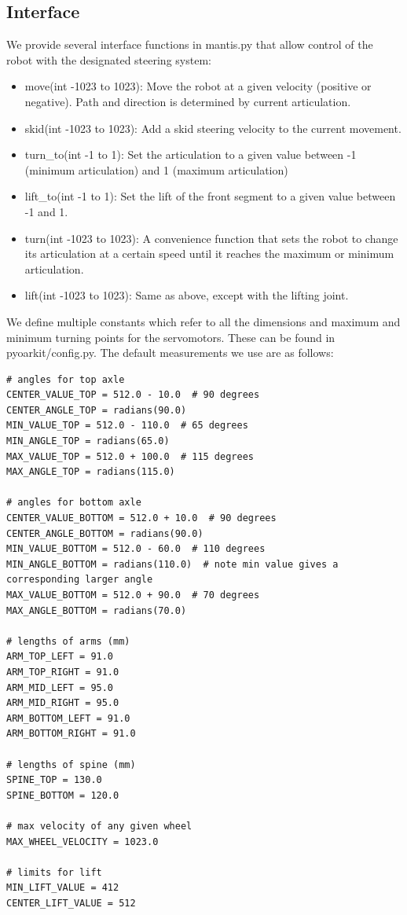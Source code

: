 \documentclass[]{article}
\begin{document}
\subsection{Interface}
We provide several interface functions in mantis.py that allow control of the robot with the designated steering system:
\begin{itemize}
    \item move(int -1023 to 1023): Move the robot at a given velocity (positive or negative). Path and direction is determined by current articulation.
    \item skid(int -1023 to 1023): Add a skid steering velocity to the current movement.
    \item turn\_to(int -1 to 1): Set the articulation to a given value between -1 (minimum articulation) and 1 (maximum articulation)
    \item lift\_to(int -1 to 1): Set the lift of the front segment to a given value between -1 and 1.
    \item turn(int -1023 to 1023): A convenience function that sets the robot to change its articulation at a certain speed until it reaches the maximum or minimum articulation.
    \item lift(int -1023 to 1023): Same as above, except with the lifting joint.
\end{itemize}

We define multiple constants which refer to all the dimensions and maximum and minimum turning points for the servomotors. These can be found in pyoarkit/config.py. The default measurements we use are as follows:
\lstset{language=Python}
\begin{lstlisting}
# angles for top axle
CENTER_VALUE_TOP = 512.0 - 10.0  # 90 degrees
CENTER_ANGLE_TOP = radians(90.0)
MIN_VALUE_TOP = 512.0 - 110.0  # 65 degrees
MIN_ANGLE_TOP = radians(65.0)
MAX_VALUE_TOP = 512.0 + 100.0  # 115 degrees
MAX_ANGLE_TOP = radians(115.0)

# angles for bottom axle
CENTER_VALUE_BOTTOM = 512.0 + 10.0  # 90 degrees
CENTER_ANGLE_BOTTOM = radians(90.0)
MIN_VALUE_BOTTOM = 512.0 - 60.0  # 110 degrees
MIN_ANGLE_BOTTOM = radians(110.0)  # note min value gives a corresponding larger angle
MAX_VALUE_BOTTOM = 512.0 + 90.0  # 70 degrees
MAX_ANGLE_BOTTOM = radians(70.0)

# lengths of arms (mm)
ARM_TOP_LEFT = 91.0
ARM_TOP_RIGHT = 91.0
ARM_MID_LEFT = 95.0
ARM_MID_RIGHT = 95.0
ARM_BOTTOM_LEFT = 91.0
ARM_BOTTOM_RIGHT = 91.0

# lengths of spine (mm)
SPINE_TOP = 130.0
SPINE_BOTTOM = 120.0

# max velocity of any given wheel
MAX_WHEEL_VELOCITY = 1023.0

# limits for lift
MIN_LIFT_VALUE = 412
CENTER_LIFT_VALUE = 512
\end{lstlisting}
\end{document}
